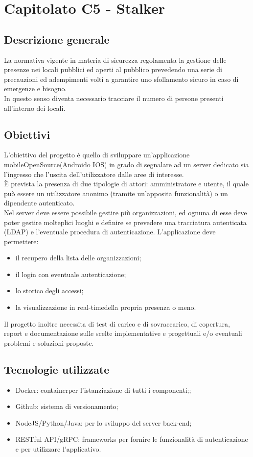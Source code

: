 \section{Capitolato C5 - Stalker}

\subsection{Descrizione generale}
La normativa vigente in materia di sicurezza regolamenta la gestione delle presenze nei locali pubblici ed aperti al pubblico prevedendo una serie di precauzioni ed adempimenti volti a garantire uno sfollamento sicuro in caso di emergenze e bisogno. \\ 
In questo senso diventa necessario tracciare il numero di persone presenti all’interno dei locali.

\subsection{Obiettivi}
L’obiettivo del progetto è quello di sviluppare un’applicazione mobile\glo OpenSource\glo (Android\glo o IOS\glo) in grado di segnalare ad un server dedicato sia l’ingresso che l’uscita dell’utilizzatore dalle aree di interesse. \\
È prevista la presenza di due tipologie di attori: amministratore e utente, il quale può essere un utilizzatore anonimo (tramite un'apposita funzionalità) o un dipendente autenticato. \\
Nel server deve essere possibile gestire più organizzazioni, ed ognuna di esse deve poter gestire molteplici luoghi e definire se prevedere una tracciatura autenticata (LDAP) e l’eventuale procedura di autenticazione.
L’applicazione deve permettere: \begin{itemize}
\item il recupero della lista delle organizzazioni;
\item il login con eventuale autenticazione;
\item lo storico degli accessi;
\item la visualizzazione in real-time\glo della propria presenza o meno.
\end{itemize}
Il progetto inoltre necessita di test di carico e di sovraccarico, di copertura, report e documentazione sulle scelte implementative e progettuali e/o eventuali problemi e soluzioni proposte.

\subsection{Tecnologie utilizzate}
\begin{itemize}
\item Docker: container\glo per l’istanziazione di tutti i componenti;;
\item Github: sistema di versionamento\glo;
\item NodeJS/Python/Java: per lo sviluppo del server back-end\glo;
\item RESTful API/gRPC: frameworks per fornire le funzionalità di autenticazione e per utilizzare l’applicativo.
\end{itemize}

